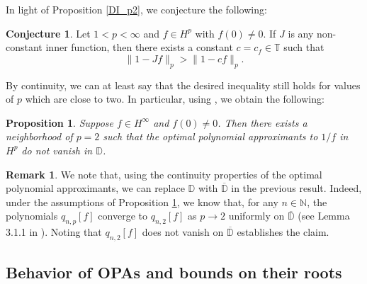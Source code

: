 \documentclass{article}
\theoremstyle{plain}
\numberwithin{Theorem}{section}
\numberwithin{equation}{section}
\theoremstyle{plain}
\newtheorem{Proposition}[Theorem]{Proposition}
\theoremstyle{definition}
\newtheorem{Conjecture}[Theorem]{Conjecture}
\newtheorem{Remark}[Theorem]{Remark}
\newcommand{\D}{\mathbb{D}}
\newcommand{\N}{\mathbb{N}}
\begin{document}

In light of Proposition \ref{DI_p2}, we conjecture the following: 

\begin{Conjecture}
Let $1 < p < \infty$ and $f \in H^p$ with $f(0) \neq 0$. If $J$ is any non-constant inner function, then there exists a constant $c = c_{f}\in\mathbb{T}$ such that 
\[
\| 1 - J f \|_p > \|1 - cf\|_p.
\]
\end{Conjecture}


By continuity, we can at least say that the desired inequality still holds for values of $p$ which are close to two. In particular, using \cite[Lemma~3.1.1]{ChengFelder}, we obtain the following:
\begin{Proposition}\label{zero-free}
    Suppose $f \in H^{\infty}$ and $f(0) \neq 0$. Then there exists a neighborhood of $p=2$ such that the optimal polynomial approximants to $1/f$ in $H^p$ do not vanish in $\D$.
\end{Proposition}

\begin{Remark}
    We note that, using the continuity properties of the optimal polynomial approximants, we can replace $\mathbb{D}$ with $\overline{\mathbb{D}}$ in the previous result. Indeed, under the assumptions of Proposition \ref{zero-free}, we know that, for any $n\in\N$, the polynomials $q_{n,p}[f]$ converge to $q_{n,2}[f]$ as $p\to2$ uniformly on $\overline{\D}$ (see Lemma 3.1.1 in \cite{ChengFelder}). Noting that $q_{n,2}[f]$ does not vanish on $\overline{\D}$ establishes the claim.
\end{Remark}


\subsection{Behavior of OPAs and bounds on their roots}
\end{document}
